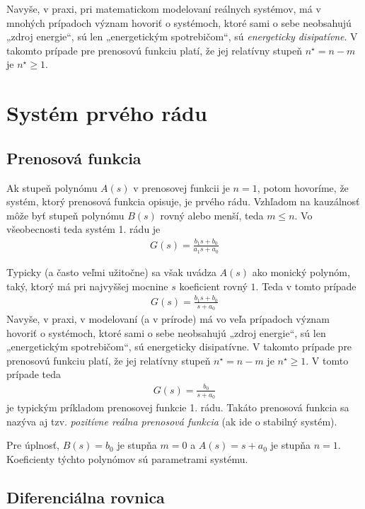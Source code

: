 \documentclass[a4paper, 10pt, ]{article}
\begin{document}
Navyše, v praxi, pri matematickom modelovaní reálnych systémov, má v mnohých prípadoch význam hovoriť o systémoch, ktoré sami o sebe neobsahujú „zdroj energie“, sú len „energetickým spotrebičom“, sú \emph{energeticky disipatívne}. V takomto prípade pre prenosovú funkciu platí, že jej relatívny stupeň $n^\star = n-m$ je $n^\star \geq 1$.



\section{Systém prvého rádu}

\subsection{Prenosová funkcia}


Ak stupeň polynómu $A(s)$ v prenosovej funkcii je $n = 1$, potom hovoríme, že systém, ktorý prenosová funkcia opisuje, je prvého rádu. Vzhľadom na kauzálnosť môže byť stupeň polynómu $B(s)$ rovný alebo menší, teda $m \leq n$. Vo všeobecnosti teda systém 1. rádu je
\begin{align}
    G(s) = \frac{b_1 s + b_0}{a_1 s + a_0}
\end{align}

Typicky (a často veľmi užitočne) sa však uvádza $A(s)$ ako monický polynóm, taký, ktorý má pri najvyššej mocnine $s$ koeficient rovný $1$. Teda v tomto prípade
\begin{align}
    G(s) = \frac{b_1 s + b_0}{s + a_0}
\end{align}
Navyše, v praxi, v modelovaní (a v prírode) má vo veľa prípadoch význam hovoriť o systémoch, ktoré sami o sebe neobsahujú „zdroj energie“, sú len „energetickým spotrebičom“, sú energeticky disipatívne. V takomto prípade pre prenosovú funkciu platí, že jej relatívny stupeň $n^\star = n-m$ je $n^\star \geq 1$. V tomto prípade teda
\begin{align} \label{eq:prvyradprenosovafunkcia}
    G(s) = \frac{b_0}{s + a_0}
\end{align}
je typickým príkladom prenosovej funkcie 1. rádu. Takáto prenosová funkcia sa nazýva aj tzv. \emph{pozitívne reálna prenosová funkcia} (ak ide o stabilný systém).

Pre úplnosť, $B(s) = b_0$ je stupňa $m=0$ a $A(s) = s + a_0$ je stupňa $n=1$. Koeficienty týchto polynómov sú parametrami systému.


\subsection{Diferenciálna rovnica}
\end{document}
